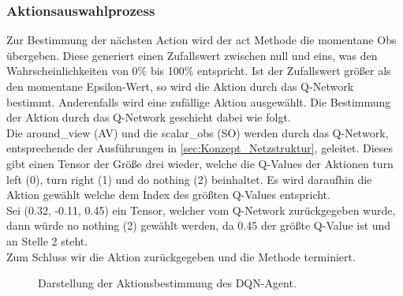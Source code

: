 \subsubsection{Aktionsauswahlprozess}
Zur Bestimmung der nächsten Action wird der act Methode die momentane Obs übergeben.
Diese generiert einen Zufallswert zwischen null und eins, was den Wahrscheinlichkeiten von 0\% bis 100\% entspricht.
Ist der Zufallswert größer als den momentane Epsilon-Wert, so wird die Aktion durch das Q-Network bestimmt. Anderenfalls wird eine zufällige Aktion ausgewählt. Die Bestimmung der Aktion durch das Q-Network geschieht dabei wie folgt.\\
Die around\_view (AV) und die scalar\_obs (SO) werden durch das Q-Network, entsprechende der Ausführungen in \ref{sec:Konzept_Netzstruktur}, geleitet. Dieses gibt einen Tensor der Größe drei wieder, welche die Q-Values der Aktionen turn left (0), turn right (1) und do nothing (2) beinhaltet.
Es wird daraufhin die Aktion gewählt welche dem Index des größten Q-Values entspricht.\\
Sei (0.32, -0.11, 0.45) ein Tensor, welcher vom Q-Network zurückgegeben wurde, dann würde no nothing (2) gewählt werden, da 0.45 der größte Q-Value ist und an Stelle 2 steht.\\
Zum Schluss wir die Aktion zurückgegeben und die Methode terminiert.
\begin{figure}[H]
	\centering
	\def\svgscale{0.13}
	
	\caption[DQN-Aktionsbestimmung]{Darstellung der Aktionsbestimmung des DQN-Agent.}
	\label{fig:DQN-Aktionsbestimmung}
\end{figure}

